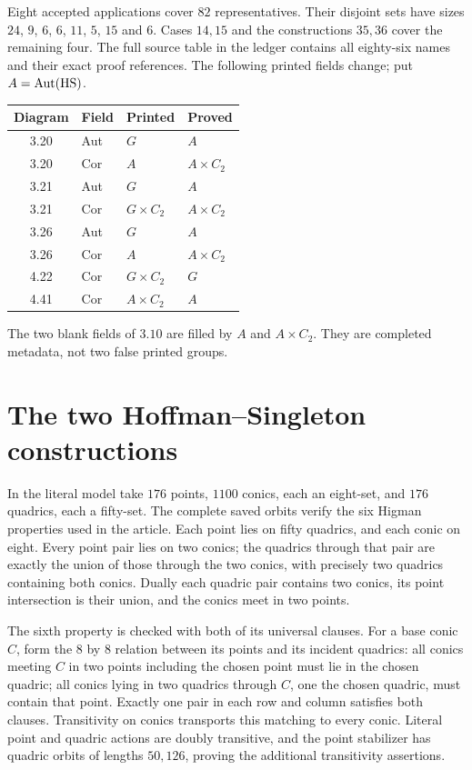 Eight accepted applications cover $82$ representatives. Their disjoint
sets have sizes $24$, $9$, $6$, $6$, $11$, $5$, $15$ and $6$.
Cases $14,15$ and the constructions
$35,36$ cover the remaining four. The full source table in the ledger
contains all eighty-six names and their exact proof references. The
following printed fields change; put $A=\operatorname{Aut}(\mathrm{HS})$.
\begin{center}
\begin{tabular}{clll}\toprule
Diagram&Field&Printed&Proved\\\midrule
3.20&Aut&$G$&$A$\\
3.20&Cor&$A$&$A\times C_2$\\
3.21&Aut&$G$&$A$\\
3.21&Cor&$G\times C_2$&$A\times C_2$\\
3.26&Aut&$G$&$A$\\
3.26&Cor&$A$&$A\times C_2$\\
4.22&Cor&$G\times C_2$&$G$\\
4.41&Cor&$A\times C_2$&$A$\\\bottomrule
\end{tabular}
\end{center}
The two blank fields of $3.10$ are filled by $A$ and $A\times C_2$.
They are completed metadata, not two false printed groups.

\section{The two Hoffman--Singleton constructions}
In the literal model take $176$ points, $1100$ conics, each an eight-set,
and $176$ quadrics, each a fifty-set. The complete saved orbits verify
the six Higman properties used in the article. Each point lies on fifty
quadrics, and each conic on eight. Every point pair lies on two conics;
the quadrics through that pair are exactly the union of those through
the two conics, with precisely two quadrics containing both conics.
Dually each quadric pair contains two conics, its point intersection is
their union, and the conics meet in two points.

The sixth property is checked with both of its universal clauses. For
a base conic $C$, form the $8$ by $8$ relation between its points and
its incident quadrics: all conics meeting $C$ in two points including
the chosen point must lie in the chosen quadric; all conics lying in
two quadrics through $C$, one the chosen quadric, must contain that
point. Exactly one pair in each row and column satisfies both clauses.
Transitivity on conics transports this matching to every conic. Literal
point and quadric actions are doubly transitive, and the point stabilizer
has quadric orbits of lengths $50,126$, proving the additional
transitivity assertions.

